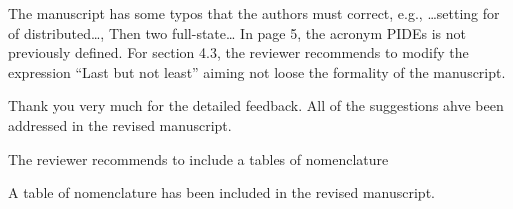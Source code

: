 \documentclass[12pt,answers]{exam}
\begin{document}
\begin{questions}
    \question The manuscript has some typos that the authors must correct, e.g., …setting for of distributed…, Then two full-state… In page 5, the acronym PIDEs is not previously defined. For section 4.3, the reviewer recommends to modify the expression “Last but not least” aiming not loose the formality of the manuscript.

    \begin{solutionorbox}
        Thank you very much for the detailed feedback. All of the suggestions ahve been addressed in the revised manuscript.
    \end{solutionorbox}


    \question The reviewer recommends to include a tables of nomenclature

    \begin{solutionorbox}
        A table of nomenclature has been included in the revised manuscript.
    \end{solutionorbox}
\end{questions}


\newpage


\end{document}
